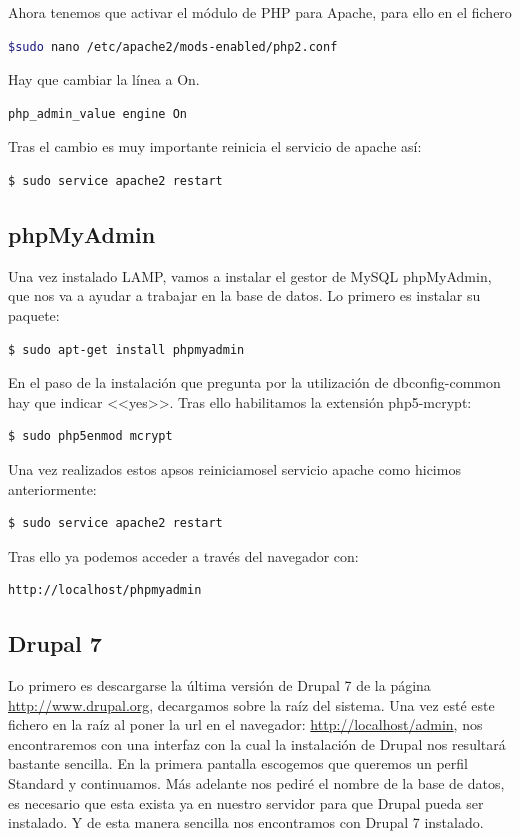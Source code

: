 Ahora tenemos que activar el módulo de PHP para Apache, para ello en el fichero
\begin{lstlisting}[language=bash,keywordstyle=\color{black}]
$sudo nano /etc/apache2/mods-enabled/php2.conf
\end{lstlisting}
Hay que cambiar la línea a On.
\begin{lstlisting}[language=bash,keywordstyle=\color{black}]
php_admin_value engine On
\end{lstlisting}
Tras el cambio es muy importante reinicia el servicio de apache así:
\begin{lstlisting}[language=bash,keywordstyle=\color{black}]
$ sudo service apache2 restart
\end{lstlisting}

\subsection{phpMyAdmin}
Una vez instalado LAMP, vamos a instalar el gestor de MySQL phpMyAdmin, que nos va a ayudar a trabajar en la base de datos. Lo primero es instalar su paquete:
\begin{lstlisting}[language=bash,keywordstyle=\color{black}]
$ sudo apt-get install phpmyadmin
\end{lstlisting} 
En el paso de la instalación que pregunta por la utilización de dbconfig-common hay que indicar <<yes>>. Tras ello habilitamos la extensión php5-mcrypt:
\begin{lstlisting}[language=bash,keywordstyle=\color{black}]
$ sudo php5enmod mcrypt
\end{lstlisting}
Una vez realizados estos apsos reiniciamosel servicio apache como hicimos anteriormente:
\begin{lstlisting}[language=bash,keywordstyle=\color{black}]
$ sudo service apache2 restart
\end{lstlisting}
Tras ello ya podemos acceder a través del navegador con:
\begin{lstlisting}[language=html,keywordstyle=\color{black}]
http://localhost/phpmyadmin
\end{lstlisting}

\subsection{Drupal 7}

Lo primero es descargarse la última versión de Drupal 7 de la página \url{http://www.drupal.org}, decargamos sobre la raíz del sistema. Una vez esté este fichero en la raíz al poner la url en el navegador: \url{http://localhost/admin}, nos encontraremos con una interfaz con la cual la instalación de Drupal nos resultará bastante sencilla.
En la primera pantalla escogemos que queremos un perfil Standard y continuamos. Más adelante nos pediré el nombre de la base de datos, es necesario que esta exista ya en nuestro servidor para que Drupal pueda ser instalado. Y de esta manera sencilla nos encontramos con Drupal 7 instalado.

